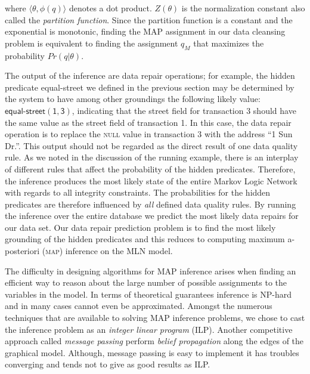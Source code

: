 where $\langle \theta, \phi(q) \rangle$ denotes a dot product. 
$Z(\theta)$ is the normalization constant also called the 
\emph{partition function}. Since the partition function is a constant and the exponential is monotonic, finding the MAP assignment in our data cleansing problem is equivalent to finding the assignment $q_M$ that maximizes the probability $Pr \left( q | \theta \right)$.

The output of the inference are data repair operations; for example, the hidden predicate \textsf{equal-street} we defined in the previous section
may be determined by the system to have among other groundings the following likely value: $\mathsf{\textsf{equal-street}(1, 3)}$, indicating that
the \textsf{street} field for transaction 3 should have the same value as the \textsf{street} field of transaction 1. 
In this case, the data repair operation is to replace the \textsc{null}
value in transaction 3 with the address ``1 Sun Dr.''. This output should not be regarded as the direct result of one data quality rule. As we noted in
the discussion of the running example, there is an interplay of different rules that affect the probability of the hidden predicates. Therefore, the inference produces the most likely state of the entire Markov Logic Network with regards to all integrity constraints. The probabilities for the hidden predicates are therefore influenced by \textit{all} defined data quality rules. By running the inference over the entire database we predict the most likely data repairs for our data set. Our data repair prediction problem is to find the most likely grounding of the hidden predicates and this reduces to computing maximum a-posteriori (\textsc{map}) inference on the MLN model. 

The difficulty in designing algorithms for MAP inference arises
when finding an efficient way to reason about the large number
of possible assignments to the variables in the model. In terms
of theoretical guarantees inference is NP-hard and in many cases
cannot even be approximated. Amongst the numerous techniques 
that are available to solving MAP inference problems, we chose to cast the inference problem as an \emph{integer linear program} (ILP). Another competitive approach called \emph{message
passing} perform \emph{belief propagation} 
along the edges of the graphical model. Although, message passing is easy to implement it has troubles converging and tends not to give as good results as ILP.  

